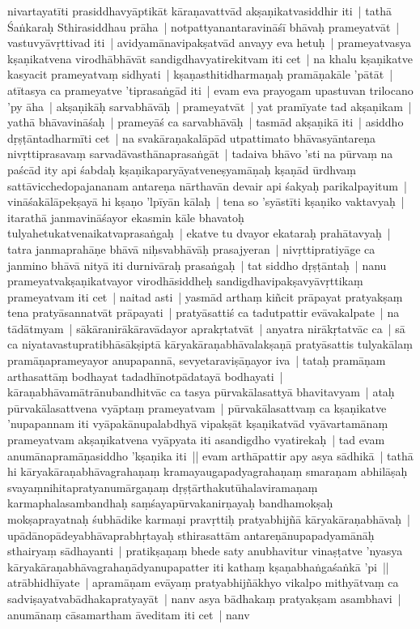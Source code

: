 \documentclass[article,12pt,a4paper]{memoir}
\newcommand{\persName}[1]{#1}
\begin{document}
nivartayatīti prasiddhavyāptikāt kāraṇavattvād akṣaṇikatvasiddhir iti | \label{thakur75-115.17} tathā Śaṅkaraḥ Sthirasiddhau prāha | notpattyanantaravināśī bhāvaḥ prameyatvāt | vastuvyāvṛttivad iti | \label{thakur75-115.18} avidyamānavipakṣatvād anvayy eva hetuḥ | prameyatvasya kṣaṇikatvena virodhābhāvāt sandigdhavyatirekitvam iti cet | \label{thakur75-115.19} na khalu kṣaṇikatve kasyacit prameyatvaṃ sidhyati | kṣaṇasthitidharmaṇaḥ pramāṇakāle 'pātāt | atītasya ca prameyatve 'tiprasaṅgād iti | \label{thakur75-115.22} evam eva prayogam upastuvan \persName{trilocano} 'py āha | akṣaṇikāḥ sarvabhāvāḥ | prameyatvāt | yat pramīyate tad akṣaṇikam | yathā bhāvavināśaḥ | prameyāś ca sarvabhāvāḥ | tasmād akṣaṇikā iti | \label{thakur75-115.25} asiddho dṛṣṭāntadharmīti cet | na svakāraṇakalāpād utpattimato bhāvasyāntareṇa nivṛttiprasavaṃ sarvadāvasthānaprasaṅgāt | tadaiva bhāvo 'sti na pūrvaṃ na paścād ity api śabdaḥ kṣaṇikaparyāyatveneṣyamāṇaḥ kṣaṇād ūrdhvaṃ sattāvicchedopajananam antareṇa nārthavān devair api śakyaḥ parikalpayitum | vināśakālāpekṣayā hi kṣaṇo 'lpīyān kālaḥ | tena so 'syāstīti kṣaṇiko vaktavyaḥ | itarathā janmavināśayor ekasmin kāle bhavatoḥ tulyahetukatvenaikatvaprasaṅgaḥ | ekatve tu dvayor ekataraḥ prahātavyaḥ | tatra janmaprahāṇe bhāvā niḥsvabhāvāḥ prasajyeran | nivṛttipratiyāge ca janmino bhāvā nityā iti durnivāraḥ prasaṅgaḥ | tat siddho dṛṣṭāntaḥ | \label{thakur75-116.1} nanu prameyatvakṣaṇikatvayor virodhāsiddheḥ sandigdhavipakṣavyāvṛttikaṃ prameyatvam iti cet | \label{thakur75-116.2} naitad asti | yasmād arthaṃ kiñcit prāpayat pratyakṣaṃ tena pratyāsannatvāt prāpayati | pratyāsattiś ca tadutpattir evāvakalpate | na tādātmyam | sākāranirākāravādayor aprakṛtatvāt | anyatra nirākṛtatvāc ca | sā ca niyatavastupratibhāsākṣiptā kāryakāraṇabhāvalakṣaṇā pratyāsattis tulyakālaṃ pramāṇaprameyayor anupapannā, sevyetaraviṣāṇayor iva | tataḥ pramāṇam arthasattāṃ bodhayat tadadhīnotpādatayā bodhayati | kāraṇabhāvamātrānubandhitvāc ca tasya pūrvakālasattyā bhavitavyam | ataḥ pūrvakālasattvena vyāptaṃ prameyatvam | pūrvakālasattvaṃ ca kṣaṇikatve 'nupapannam iti vyāpakānupalabdhyā vipakṣāt kṣaṇikatvād vyāvartamānaṃ prameyatvam akṣaṇikatvena vyāpyata iti asandigdho vyatirekaḥ | \label{thakur75-116.10} tad evam anumānapramāṇasiddho 'kṣaṇika iti || \label{thakur75-116.11} evam arthāpattir apy asya sādhikā | tathā hi kāryakāraṇabhāvagrahaṇaṃ kramayaugapadyagrahaṇaṃ smaraṇam abhilāṣaḥ svayaṃnihitapratyanumārgaṇaṃ dṛṣṭārthakutūhalaviramaṇaṃ karmaphalasambandhaḥ saṃśayapūrvakanirṇayaḥ bandhamokṣaḥ mokṣaprayatnaḥ śubhādike karmaṇi pravṛttiḥ pratyabhijñā kāryakāraṇabhāvaḥ | upādānopādeyabhāvaprabhṛtayaḥ sthirasattām antareṇānupapadyamānāḥ sthairyaṃ sādhayanti | pratikṣaṇaṃ bhede saty anubhavitur vinaṣṭatve 'nyasya kāryakāraṇabhāvagrahaṇādyanupapatter iti kathaṃ kṣaṇabhaṅgaśaṅkā 'pi || \label{thakur75-116.17} atrābhidhīyate | apramāṇam evāyaṃ pratyabhijñākhyo vikalpo mithyātvaṃ ca sadviṣayatvabādhakapratyayāt | \label{thakur75-116.18} nanv asya bādhakaṃ pratyakṣam asambhavi | anumānaṃ cāsamartham āveditam iti cet | nanv 
\end{document}

